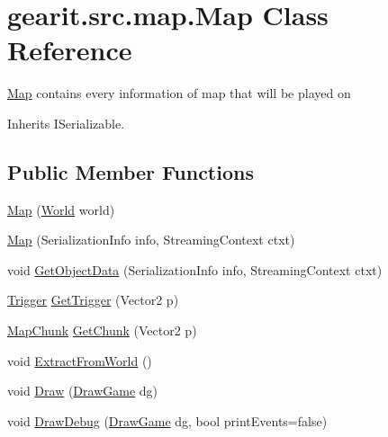 \hypertarget{classgearit_1_1src_1_1map_1_1_map}{\section{gearit.\+src.\+map.\+Map Class Reference}
\label{classgearit_1_1src_1_1map_1_1_map}
}


\hyperlink{classgearit_1_1src_1_1map_1_1_map}{Map} contains every information of map that will be played on  




Inherits I\+Serializable.

\subsection*{Public Member Functions}
\begin{DoxyCompactItemize}
\item 
\hyperlink{classgearit_1_1src_1_1map_1_1_map_a13e8273e31e8a976e4b3d389d91870e6}{Map} (\hyperlink{class_farseer_physics_1_1_dynamics_1_1_world}{World} world)
\item 
\hyperlink{classgearit_1_1src_1_1map_1_1_map_a6567784cc714ce7075f233588cdce0c8}{Map} (Serialization\+Info info, Streaming\+Context ctxt)
\item 
void \hyperlink{classgearit_1_1src_1_1map_1_1_map_a0d6fa28a473f6af940775cdc9adf5f89}{Get\+Object\+Data} (Serialization\+Info info, Streaming\+Context ctxt)
\item 
\hyperlink{classgearit_1_1src_1_1map_1_1_trigger}{Trigger} \hyperlink{classgearit_1_1src_1_1map_1_1_map_ad878c7f3abd4168f2b2c36f8f1d8650d}{Get\+Trigger} (Vector2 p)
\item 
\hyperlink{classgearit_1_1src_1_1editor_1_1map_1_1_map_chunk}{Map\+Chunk} \hyperlink{classgearit_1_1src_1_1map_1_1_map_a91a393883b7c7e97782022033a17088d}{Get\+Chunk} (Vector2 p)
\item 
void \hyperlink{classgearit_1_1src_1_1map_1_1_map_a42fba9058bd6948eb06d8e8fb0105776}{Extract\+From\+World} ()
\item 
void \hyperlink{classgearit_1_1src_1_1map_1_1_map_a5c74ec9fd09748600208847f5a3a681f}{Draw} (\hyperlink{classgearit_1_1src_1_1_draw_game}{Draw\+Game} dg)
\item 
void \hyperlink{classgearit_1_1src_1_1map_1_1_map_a4299c6202671de476551a6197d936e59}{Draw\+Debug} (\hyperlink{classgearit_1_1src_1_1_draw_game}{Draw\+Game} dg, bool print\+Events=false)
\end{DoxyCompactItemize}
